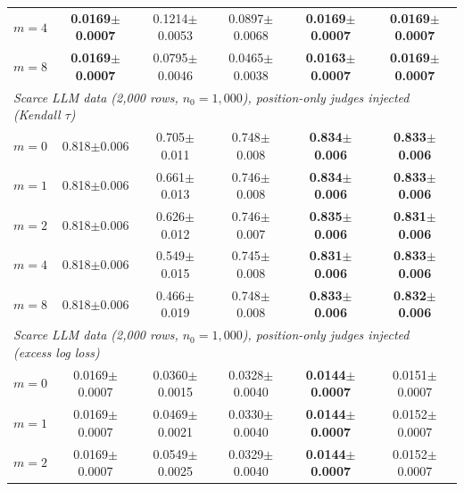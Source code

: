 \begin{table}[!t]
{\begin{tabular}{lccccc}
\quad $m=4$ & \textbf{0.0169{\scriptsize$\pm$0.0007}} & 0.1214{\scriptsize$\pm$0.0053} & 0.0897{\scriptsize$\pm$0.0068} & \textbf{0.0169{\scriptsize$\pm$0.0007}} & \textbf{0.0169{\scriptsize$\pm$0.0007}} \\
\quad $m=8$ & \textbf{0.0169{\scriptsize$\pm$0.0007}} & 0.0795{\scriptsize$\pm$0.0046} & 0.0465{\scriptsize$\pm$0.0038} & \textbf{0.0163{\scriptsize$\pm$0.0007}} & \textbf{0.0169{\scriptsize$\pm$0.0007}} \\
\midrule
\multicolumn{6}{l}{\emph{Scarce LLM data (2,000 rows, $n_0=1{,}000$), position-only judges injected (Kendall $\tau$)}} \\
\quad $m=0$ & 0.818{\scriptsize$\pm$0.006} & 0.705{\scriptsize$\pm$0.011} & 0.748{\scriptsize$\pm$0.008} & \textbf{0.834{\scriptsize$\pm$0.006}} & \textbf{0.833{\scriptsize$\pm$0.006}} \\
\quad $m=1$ & 0.818{\scriptsize$\pm$0.006} & 0.661{\scriptsize$\pm$0.013} & 0.746{\scriptsize$\pm$0.008} & \textbf{0.834{\scriptsize$\pm$0.006}} & \textbf{0.833{\scriptsize$\pm$0.006}} \\
\quad $m=2$ & 0.818{\scriptsize$\pm$0.006} & 0.626{\scriptsize$\pm$0.012} & 0.746{\scriptsize$\pm$0.007} & \textbf{0.835{\scriptsize$\pm$0.006}} & \textbf{0.831{\scriptsize$\pm$0.006}} \\
\quad $m=4$ & 0.818{\scriptsize$\pm$0.006} & 0.549{\scriptsize$\pm$0.015} & 0.745{\scriptsize$\pm$0.008} & \textbf{0.831{\scriptsize$\pm$0.006}} & \textbf{0.833{\scriptsize$\pm$0.006}} \\
\quad $m=8$ & 0.818{\scriptsize$\pm$0.006} & 0.466{\scriptsize$\pm$0.019} & 0.748{\scriptsize$\pm$0.008} & \textbf{0.833{\scriptsize$\pm$0.006}} & \textbf{0.832{\scriptsize$\pm$0.006}} \\
\midrule
\multicolumn{6}{l}{\emph{Scarce LLM data (2,000 rows, $n_0=1{,}000$), position-only judges injected (excess log loss)}} \\
\quad $m=0$ & 0.0169{\scriptsize$\pm$0.0007} & 0.0360{\scriptsize$\pm$0.0015} & 0.0328{\scriptsize$\pm$0.0040} & \textbf{0.0144{\scriptsize$\pm$0.0007}} & 0.0151{\scriptsize$\pm$0.0007} \\
\quad $m=1$ & 0.0169{\scriptsize$\pm$0.0007} & 0.0469{\scriptsize$\pm$0.0021} & 0.0330{\scriptsize$\pm$0.0040} & \textbf{0.0144{\scriptsize$\pm$0.0007}} & 0.0152{\scriptsize$\pm$0.0007} \\
\quad $m=2$ & 0.0169{\scriptsize$\pm$0.0007} & 0.0549{\scriptsize$\pm$0.0025} & 0.0329{\scriptsize$\pm$0.0040} & \textbf{0.0144{\scriptsize$\pm$0.0007}} & 0.0152{\scriptsize$\pm$0.0007} \\

\end{tabular}}
\end{table}
